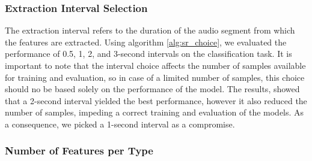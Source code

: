 \subsubsection*{Extraction Interval Selection}  %
\label{sec:extraction_interval}
The extraction interval refers to the duration of the audio segment from which the features are extracted.
Using algorithm \ref{alg:sr_choice}, we evaluated the performance of 0.5, 1, 2, and 3-second intervals
on the classification task. It is important to note that the interval choice affects the number of samples 
available for training and evaluation, so in case of a limited number of samples, this choice should no be based
solely on the performance of the model. The results, showed that a 2-second interval yielded the best performance, 
however it also reduced the number of samples, impeding a correct training and evaluation of the models. 
As a consequence, we picked a 1-second interval as a compromise.

\subsubsection*{Number of Features per Type} %